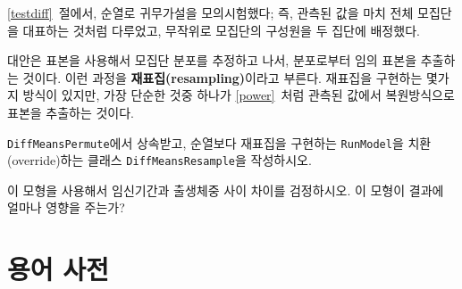 \begin{exercise}

\ref{testdiff}~절에서, 
순열로 귀무가설을 모의시험했다; 즉,
관측된 값을 마치 전체 모집단을 대표하는 것처럼 다루었고,
무작위로 모집단의 구성원을 두 집단에 배정했다.

대안은 표본을 사용해서 모집단 분포를 추정하고 나서, 분포로부터 임의 표본을 추출하는 것이다.
이런 과정을 {\bf 재표집(resampling)}이라고 부른다.
재표집을 구현하는 몇가지 방식이 있지만, 가장 단순한 것중 하나가 \ref{power}~처럼 관측된 값에서 복원방식으로 표본을 추출하는 것이다.


{\tt DiffMeansPermute}에서 상속받고, 순열보다 재표집을 구현하는 {\tt RunModel}을 
치환(override)하는 클래스 {\tt DiffMeansResample}을 작성하시오.

이 모형을 사용해서 임신기간과 출생체중 사이 차이를 검정하시오.
이 모형이 결과에 얼마나 영향을 주는가?

\end{exercise}


\section{용어 사전}

